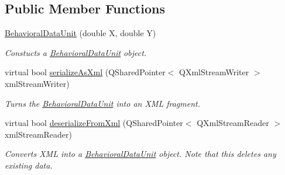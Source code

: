 \subsection*{Public Member Functions}
\begin{DoxyCompactItemize}
\item 
\hyperlink{class_picto_1_1_behavioral_data_unit_a14af1fc5a84f9786ba712dcc065d8fbf}{Behavioral\-Data\-Unit} (double X, double Y)
\begin{DoxyCompactList}\small\item\em Constucts a \hyperlink{class_picto_1_1_behavioral_data_unit}{Behavioral\-Data\-Unit} object. \end{DoxyCompactList}\item 
\hypertarget{class_picto_1_1_behavioral_data_unit_a8d67dfb79dcfa71b91a8ae7148cc2521}{virtual bool \hyperlink{class_picto_1_1_behavioral_data_unit_a8d67dfb79dcfa71b91a8ae7148cc2521}{serialize\-As\-Xml} (Q\-Shared\-Pointer$<$ Q\-Xml\-Stream\-Writer $>$ xml\-Stream\-Writer)}\label{class_picto_1_1_behavioral_data_unit_a8d67dfb79dcfa71b91a8ae7148cc2521}

\begin{DoxyCompactList}\small\item\em Turns the \hyperlink{class_picto_1_1_behavioral_data_unit}{Behavioral\-Data\-Unit} into an X\-M\-L fragment. \end{DoxyCompactList}\item 
\hypertarget{class_picto_1_1_behavioral_data_unit_abe47e94377bc930caa4526617a3fe408}{virtual bool \hyperlink{class_picto_1_1_behavioral_data_unit_abe47e94377bc930caa4526617a3fe408}{deserialize\-From\-Xml} (Q\-Shared\-Pointer$<$ Q\-Xml\-Stream\-Reader $>$ xml\-Stream\-Reader)}\label{class_picto_1_1_behavioral_data_unit_abe47e94377bc930caa4526617a3fe408}

\begin{DoxyCompactList}\small\item\em Converts X\-M\-L into a \hyperlink{class_picto_1_1_behavioral_data_unit}{Behavioral\-Data\-Unit} object. Note that this deletes any existing data. \end{DoxyCompactList}\end{DoxyCompactItemize}
